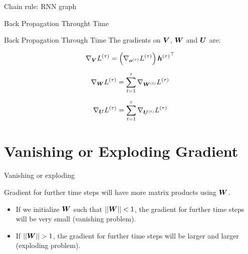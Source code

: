 \documentclass[10pt]{beamer}
\begin{document}
\begin{frame}{Chain rule: RNN graph}

\end{frame}


\begin{frame}{Back Propagation Throught Time}

\end{frame}

\begin{frame}{Back Propagation Through Time}
The gradients on $\bm{V}$, $\bm{W}$ and $\bm{U}$ are:
\vspace{0.3cm}
\Large{
\begin{equation*}
\nabla_{\bm{V}} {L^{(\tau)}} = \left({\nabla_{\bm{o}^{(\tau)}} {L^{(\tau)}}}\right){\bm{h}^{(\tau)}}^{\top} 
\end{equation*}


\begin{equation*}
\nabla_{\bm{W}} {L^{(\tau)}} = \sum_{t=1}^{\tau}\nabla_{\bm{W}^{(t)}} {L^{(\tau)}}
\end{equation*}

\begin{equation*}
\nabla_{\bm{U}} {L^{(\tau)}} = \sum_{t=1}^{\tau}\nabla_{\bm{U}^{(t)}} {L^{(\tau)}}
\end{equation*}
}
\end{frame}

\section{Vanishing or Exploding Gradient}


\begin{frame}{Vanishing or exploding}

Gradient for further time steps will have more matrix products using $\bm{W}$.

\vspace{0.3cm}

\begin{itemize}
\item If we initialize $\bm{W}$ such that $||\bm{W}|| < 1$, the gradient for further time steps will be very small (\alert{vanishing problem}). 
\vspace{0.5cm}
\item If $||\bm{W}|| > 1$, the gradient for further time steps will be larger and larger (\alert{exploding problem}).
\end{itemize}
\end{frame}
\end{document}
